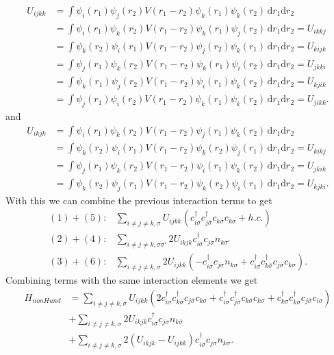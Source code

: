 \documentclass[12pt,a4paper]{scrartcl}
\numberwithin{equation}{section}
\begin{document}
\begin{align}
 U_{ijkk}
 &= \int \psi_i(r_1) \psi_j(r_2) V(r_1-r_2) \psi_k(r_1) \psi_k(r_2) \, \mathrm{d}r_1\mathrm{d}r_2 \\
 &= \int \psi_i(r_1) \psi_k(r_2) V(r_1-r_2) \psi_k(r_1) \psi_j(r_2) \, \mathrm{d}r_1\mathrm{d}r_2 = U_{ikkj} \\
 &= \int \psi_k(r_2) \psi_i(r_1) V(r_1-r_2) \psi_j(r_2) \psi_k(r_1) \, \mathrm{d}r_1\mathrm{d}r_2 = U_{kijk} \\
 &= \int \psi_j(r_1) \psi_k(r_2) V(r_1-r_2) \psi_k(r_1) \psi_i(r_2) \, \mathrm{d}r_1\mathrm{d}r_2 = U_{jkki} \\
 &= \int \psi_k(r_1) \psi_j(r_2) V(r_1-r_2) \psi_i(r_1) \psi_k(r_2) \, \mathrm{d}r_1\mathrm{d}r_2 = U_{kjik} \\
 &= \int \psi_j(r_1) \psi_i(r_2) V(r_1-r_2) \psi_k(r_1) \psi_k(r_2) \, \mathrm{d}r_1\mathrm{d}r_2 = U_{jikk} .
\end{align}
and 
\begin{align}
 U_{ikjk}
 &= \int \psi_i(r_1) \psi_k(r_2) V(r_1-r_2) \psi_j(r_1) \psi_k(r_2) \, \mathrm{d}r_1\mathrm{d}r_2 \\
 &= \int \psi_k(r_2) \psi_i(r_1) V(r_1-r_2) \psi_k(r_2) \psi_j(r_1) \, \mathrm{d}r_1\mathrm{d}r_2 = U_{kikj} \\
 &= \int \psi_j(r_1) \psi_k(r_2) V(r_1-r_2) \psi_i(r_1) \psi_k(r_2) \, \mathrm{d}r_1\mathrm{d}r_2 = U_{jkik} \\
 &= \int \psi_k(r_2) \psi_j(r_1) V(r_1-r_2) \psi_k(r_2) \psi_i(r_1) \, \mathrm{d}r_1\mathrm{d}r_2 = U_{kjki} .
\end{align}
With this we can combine the previous interaction terms to get
\begin{align}
 (1)+(5):& \sum_{i\neq j\neq k,\sigma} U_{ijkk} ( c^{\dagger}_{i\sigma} c^{\dagger}_{j\bar{\sigma}} c_{k\bar{\sigma}} c_{k\sigma} + h.c. ) \\
%
 (2)+(4):&  \sum_{i\neq j\neq k,\sigma\sigma'} 2 U_{ikjk} c^{\dagger}_{i\sigma} c_{j\sigma}  n_{k\sigma'} \\
%
 (3)+(6):& \sum_{i\neq j\neq k,\sigma} 2 U_{ijkk} ( - c^{\dagger}_{i\sigma} c_{j\sigma} n_{k\sigma}
                            +c^{\dagger}_{i\sigma} c^{\dagger}_{k\bar{\sigma}} c_{j\bar{\sigma}} c_{k\sigma} ) .
\end{align}
Combining terms with the same interaction elements we get 
\begin{align}
 H_{nonHund} 
 &= \sum_{i\neq j\neq k,\sigma} U_{ijkk} ( 2c^{\dagger}_{i\sigma} c^{\dagger}_{k\bar{\sigma}} c_{j\bar{\sigma}} c_{k\sigma}
                               + c^{\dagger}_{i\sigma} c^{\dagger}_{j\bar{\sigma}} c_{k\bar{\sigma}} c_{k\sigma} 
                               + c^{\dagger}_{k\sigma} c^{\dagger}_{k\bar{\sigma}} c_{j\bar{\sigma}} c_{i\sigma} ) \\
%
&+  \sum_{i\neq j\neq k,\sigma} 2 U_{ikjk} c^{\dagger}_{i\sigma} c_{j\sigma}  n_{k\bar{\sigma}} \\
&+  \sum_{i\neq j\neq k,\sigma} 2 (U_{ikjk} - U_{ijkk}) c^{\dagger}_{i\sigma} c_{j\sigma}  n_{k\sigma} .
\end{align}
\end{document}
